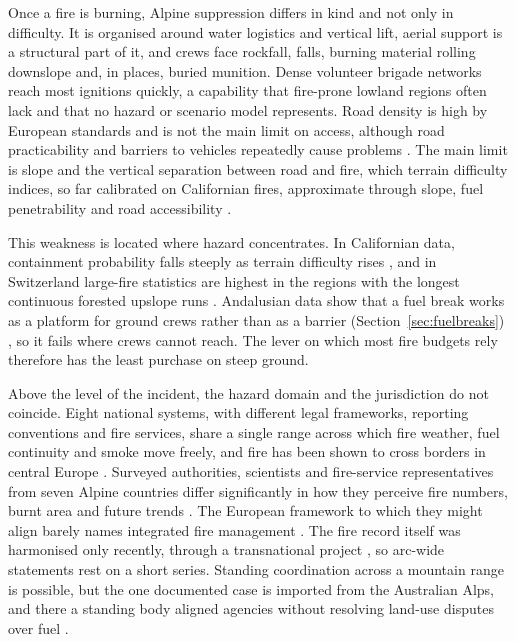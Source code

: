 \documentclass[11pt,a4paper]{article}
\begin{document}
Once a fire is burning, Alpine suppression differs in kind and not only in difficulty. It is organised around water logistics and vertical lift, aerial support is a structural part of it, and crews face rockfall, falls, burning material rolling downslope and, in places, buried munition. Dense volunteer brigade networks reach most ignitions quickly, a capability that fire-prone lowland regions often lack and that no hazard or scenario model represents. Road density is high by European standards and is not the main limit on access, although road practicability and barriers to vehicles repeatedly cause problems \citep{muller_forest_2020}. The main limit is slope and the vertical separation between road and fire, which terrain difficulty indices, so far calibrated on Californian fires, approximate through slope, fuel penetrability and road accessibility \citep{cardil_assessing_2025}.

This weakness is located where hazard concentrates. In Californian data, containment probability falls steeply as terrain difficulty rises \citep{cardil_assessing_2025}, and in Switzerland large-fire statistics are highest in the regions with the longest continuous forested upslope runs \citep{conedera_linking_2024}. Andalusian data show that a fuel break works as a platform for ground crews rather than as a barrier (Section~\ref{sec:fuelbreaks}) \citep{ortega_modeling_2024}, so it fails where crews cannot reach. The lever on which most fire budgets rely therefore has the least purchase on steep ground.

Above the level of the incident, the hazard domain and the jurisdiction do not coincide. Eight national systems, with different legal frameworks, reporting conventions and fire services, share a single range across which fire weather, fuel continuity and smoke move freely, and fire has been shown to cross borders in central Europe \citep{avouris_exposure_2025}. Surveyed authorities, scientists and fire-service representatives from seven Alpine countries differ significantly in how they perceive fire numbers, burnt area and future trends \citep{hoang_stakeholders_2026}. The European framework to which they might align barely names integrated fire management \citep{plana_framing_2024}. The fire record itself was harmonised only recently, through a transnational project \citep{valese_wildfires_2011}, so arc-wide statements rest on a short series. Standing coordination across a mountain range is possible, but the one documented case is imported from the Australian Alps, and there a standing body aligned agencies without resolving land-use disputes over fuel \citep{lockwood_biodiversity_2014}.
\end{document}
